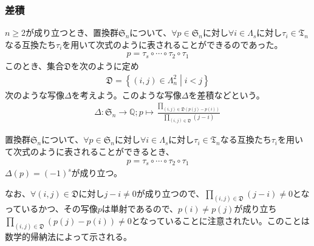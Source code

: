 \documentclass[dvipdfmx]{jsarticle}
\begin{document}
\subsubsection{差積}%
\begin{dfn}
$n \geq 2$が成り立つとき、置換群$\mathfrak{S}_{n}$について、$\forall p \in \mathfrak{S}_{n}$に対し$\forall i \in \varLambda_{s}$に対し$\tau_{i} \in \mathfrak{T}_{n}$なる互換たち$\tau_{i}$を用いて次式のように表されることができるのであった。
\begin{align*}
p = \tau_{s} \circ \cdots \circ \tau_{2} \circ \tau_{1}
\end{align*}
このとき、集合$\mathfrak{D}$を次のように定め
\begin{align*}
\mathfrak{D} =\left\{ (i,j) \in \varLambda_{n}^{2} \middle| i < j \right\}
\end{align*}
次のような写像$\varDelta$を考えよう。このような写像$\varDelta$を差積などという。
\begin{align*}
\varDelta:\mathfrak{S}_{n} \rightarrow \mathbb{Q};p \mapsto \frac{\prod_{(i,j)\in \mathfrak{D} \left( p(j) - p(i) \right)}}{\prod_{(i,j)\in \mathfrak{D} } (j - i)}
\end{align*}
\end{dfn}
\begin{thm}\label{2.1.10.4}
置換群$\mathfrak{S}_n $について、$\forall p \in \mathfrak{S}_{n}$に対し$\forall i \in \varLambda_{s}$に対し$\tau_{i} \in \mathfrak{T}_{n}$なる互換たち$\tau_{i}$を用いて次式のように表されることができるとき、
\begin{align*}
  p = \tau_{s} \circ \cdots \circ \tau_{2} \circ \tau_{1}
\end{align*}
$\varDelta (p)=\left( -1\right)^s $が成り立つ。
\end{thm}\par
なお、$\forall(i,j)\in \mathfrak{D}$に対し$j - i \neq 0$が成り立つので、$\prod_{(i,j)\in \mathfrak{D} } (j - i) \neq 0$となっているかつ、その写像$p$は単射であるので、$p(i) \neq p(j)$が成り立ち$\prod_{(i,j)\in \mathfrak{D} } \left( p(j) - p(i) \right) \neq 0$となっていることに注意されたい。このことは数学的帰納法によって示される。
\end{document}
